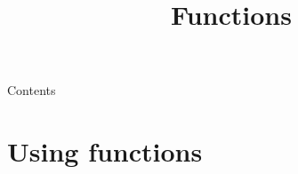 
\newcommand {\topic}{
    Functions
}
\usepackage{tikz}
\usepackage[absolute,overlay]{textpos}

\setlength{\TPHorizModule}{1cm}
\setlength{\TPVertModule}{1cm}


\title{\topic}
\supertitle{\course}
\date{}



\maketitle

\begin{frame}{Contents}
    \tableofcontents
\end{frame}

\section{Using functions}
\subsection{}

